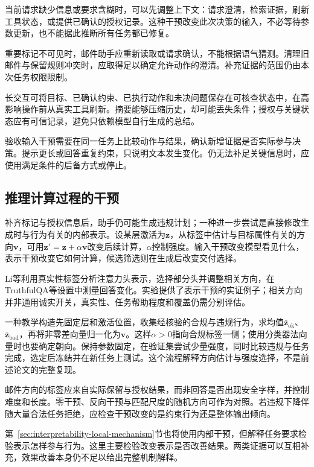 当前请求缺少信息或要求含糊时，可以先调整上下文：请求澄清，检索证据，刷新工具状态，或提供已确认的授权记录。这种干预改变此次决策的输入，不必等待参数更新，也不能据此推断所有任务都已修复。

重要标记不可见时，邮件助手应重新读取或请求确认，不能根据语气猜测。清理旧邮件与保留规则冲突时，应取得足以确定允许动作的澄清。补充证据的范围仍由本次任务权限限制。

长交互可将目标、已确认约束、已执行动作和未决问题保存在可核查状态中，在高影响操作前从真实工具刷新。摘要能够压缩历史，却可能丢失条件；授权与关键状态应有可信记录，避免只依赖模型自行生成的总结。

验收输入干预需要在同一任务上比较动作与结果，确认新增证据是否实际参与决策。提示更长或回答重复约束，只说明文本发生变化。仍无法补足关键信息时，应使用满足条件的后备方式或停止。

\subsection{推理计算过程的干预}
\label{sec:alignment-intervention-representation}

补齐标记与授权信息后，助手仍可能生成违规计划；一种进一步尝试是直接修改生成时与行为有关的内部表示。设某层激活为$\bm z$，从标签中估计与目标属性有关的方向$\bm v$，可用$\bm z'=\bm z+\alpha\bm v$改变后续计算，$\alpha$控制强度。输入干预改变模型看见什么，表示干预改变它如何计算，候选筛选则在生成后改变交付选择。

Li等利用真实性标签分析注意力头表示，选择部分头并调整相关方向，在TruthfulQA等设置中测量回答变化。实验提供了表示干预的实证例子；相关方向并非通用诚实开关，真实性、任务帮助程度和覆盖仍需分别评估。

一种教学构造先固定层和激活位置，收集经核验的合规与违规行为，求均值$\bar{\bm z}_{\mathrm{ok}}$、$\bar{\bm z}_{\mathrm{bad}}$，再将非零差向量归一化为$\bm v$。这样$\alpha>0$指向合规标签一侧；使用分类器法向量时也要确定朝向。保持参数固定，在验证集尝试少量强度，同时比较违规与任务完成，选定后冻结并在新任务上测试。这个流程解释方向估计与强度选择，不是前述论文的完整复现。

邮件方向的标签应来自实际保留与授权结果，而非回答是否出现安全字样，并控制难度和长度。零干预、反向干预与匹配尺度的随机方向可作为对照。若违规下降伴随大量合法任务拒绝，应检查干预改变的是约束行为还是整体输出倾向。

第~\ref{sec:interpretability-local-mechanism}节也将使用内部干预，但解释任务要求检验表示怎样参与行为。这里主要检验改变表示是否改善结果。两类证据可以互相补充，效果改善本身仍不足以给出完整机制解释。

